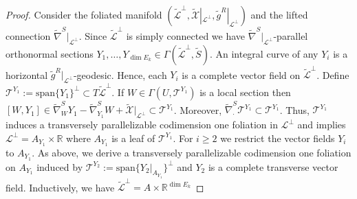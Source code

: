 \documentclass[a4paper,10pt,twoside]{amsart}
\theoremstyle{definition}
\theoremstyle{remark}
\numberwithin{equation}{section}
\begin{document}
\begin{proof}
	Consider the foliated manifold $(\tilde{\mathcal{L}}^{\perp},\tilde{\mathcal{X}}|_{\mathcal{L}^{\perp}},\tilde{g}^{R}|_{\mathcal{L}^{\perp}})$
	and the lifted connection $\tilde{\nabla}^{S}|_{\mathcal{L}^{\perp}}$. Since $\tilde{\mathcal{L}}^{\perp}$ is simply connected we have
	$\tilde{\nabla}^{S}|_{\mathcal{L}^{\perp}}$-parallel orthonormal sections
	$Y_{1},\ldots,Y_{\dim E_{k}} \in \Gamma(\tilde{\mathcal{L}}^{\perp},\tilde{S})$. An integral curve of any $Y_{i}$ is a horizontal
	$\tilde{g}^{R}|_{\mathcal{L}^{\perp}}$-geodesic. Hence, each $Y_{i}$ is a complete vector field on $\tilde{\mathcal{L}}^{\perp}$.
	Define $\mathcal{T}^{Y_{1}} := \mbox{span}\{Y_{1}\}^{\perp} \subset T\tilde{\mathcal{L}}^{\perp}$. If $W \in \Gamma(U,\mathcal{T}^{Y_{1}})$ is
	a local section then $[W,Y_{1}] \in \tilde{\nabla}^{S}_{W}{Y_{1}} - \tilde{\nabla}^{S}_{Y_{1}}{W} + \tilde{\mathcal{X}}|_{\mathcal{L}^{\perp}}
					\subset \mathcal{T}^{Y_{1}}$.
	Moreover, $\tilde{\nabla}^{S}_{\cdot}\mathcal{T}^{Y_{1}} \subset \mathcal{T}^{Y_{1}}$. Thus, $\mathcal{T}^{Y_{1}}$ induces a transversely
	parallelizable codimension one foliation in $\mathcal{L}^{\perp}$ and \cite[Prop. 5.3]{MR0370617} implies
	$\mathcal{L}^{\perp} = A_{Y_{1}} \times {\mathbb{R}}$ where $A_{Y_{1}}$ is a leaf of $\mathcal{T}^{Y_{1}}$. For $i \geq 2$ we restrict the vector fields
	$Y_{i}$ to $A_{Y_{1}}$. As above, we derive a transversely parallelizable codimension one foliation on $A_{Y_{1}}$ induced by
	$\mathcal{T}^{Y_{2}}:=\mbox{span}\{Y_{2}|_{A_{Y_{1}}}\}^{\perp}$ and $Y_{2}$ is a complete transverse vector field. Inductively, we have
	$\tilde{\mathcal{L}}^{\perp} = A \times {\mathbb{R}}^{\dim E_{k}}$
\end{proof}
\end{document}
